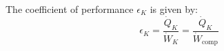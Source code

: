 The coefficient of performance \( \epsilon_K \) is given by:  
\[
\epsilon_K = \frac{\dot{Q}_K}{\dot{W}_K} = \frac{\dot{Q}_K}{\dot{W}_{\text{comp}}}
\]